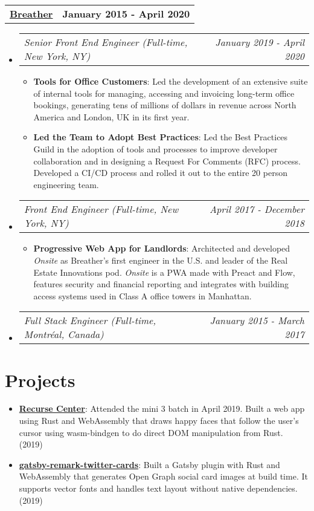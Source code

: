 \documentclass[letterpaper,10.8pt]{article}
\makeatletter
\newcommand{\resumeItem}[2]{
  \item\small{
    \textbf{#1}{: #2 \vspace{-2pt}}
  }
}
\newcommand{\jobLineItem}[2]{
  \vspace{0pt}\item[]
    \begin{tabular*}{0.98\textwidth}{l@{\extracolsep{\fill}}r}
      \textit{#1} & \textit{\small #2} \\
    \end{tabular*}\vspace{-4pt}
}
\newcommand{\employerTitle}[3]{
  \begin{tabular*}{1\textwidth}{l@{\extracolsep{\fill}}r}
    \href{#1}{\textbf{#2}} & \textbf{#3} \\
  \end{tabular*}\vspace{-4pt}
}
\newcommand{\resumeSubItem}[2]{\resumeItem{#1}{#2}\vspace{-5pt}}
\newcommand{\resumeSubHeadingListStart}{\begin{itemize}[leftmargin=*]}
\newcommand{\resumeSubHeadingListEnd}{\end{itemize}}
\newcommand{\resumeItemListStart}{\begin{itemize}}
\newcommand{\resumeItemListEnd}{\end{itemize}\vspace{-5pt}}
\makeatother
\begin{document}
  \employerTitle
    {https://breather.com}{Breather}{January 2015 - April 2020}
  \resumeSubHeadingListStart
    \jobLineItem
        {Senior Front End Engineer (Full-time, New York, NY)}{January 2019 - April 2020}
    \resumeItemListStart
        \resumeItem{Tools for Office Customers}
        {Led the development of an extensive suite of internal tools for managing, accessing and invoicing long-term office bookings, generating tens of millions of dollars in revenue across North America and London, UK in its first year.}
        \resumeItem{Led the Team to Adopt Best Practices}
        {Led the Best Practices Guild in the adoption of tools and processes to improve developer collaboration and in designing a Request For Comments (RFC) process. Developed a CI/CD process and rolled it out to the entire 20 person engineering team.}
    \resumeItemListEnd
    \jobLineItem
        {Front End Engineer (Full-time, New York, NY)}{April 2017 - December 2018}
    \resumeItemListStart
        \resumeItem{Progressive Web App for Landlords}
        {Architected and developed \textit{Onsite} as Breather’s first engineer in the U.S. and leader of the Real Estate Innovations pod. \textit{Onsite} is a PWA made with Preact and Flow, features security and financial reporting and integrates with building access systems used in Class A office towers in Manhattan.}
      \resumeItemListEnd
    \jobLineItem
		    {Full Stack Engineer (Full-time, Montréal, Canada)}{January 2015 - March 2017}
    \resumeSubHeadingListEnd

\section{Projects}
\resumeSubHeadingListStart
\resumeSubItem{\href{https://github.com/alessbell/lines}{Recurse Center}}{Attended the mini 3 batch in April 2019. Built a web app using Rust and WebAssembly that draws happy faces that follow the user's cursor using wasm-bindgen to do direct DOM manipulation from Rust. (2019)}
\resumeSubItem{\href{https://aless.co/gatsby-wasm-plugin/}{gatsby-remark-twitter-cards}}{Built a Gatsby plugin with Rust and WebAssembly that generates Open Graph social card images at build time. It supports vector fonts and handles text layout without native dependencies. (2019)}
\vspace{5px}
\resumeSubHeadingListEnd

\end{document}
